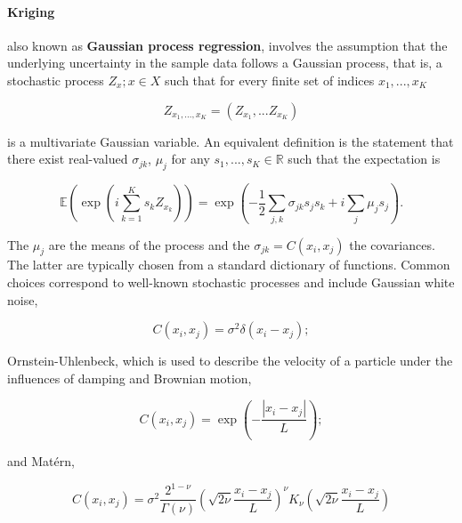 \paragraph{Kriging} also known as \textbf{Gaussian process regression}, involves the assumption that the underlying uncertainty 
in the sample data follows a Gaussian process, that is, a stochastic process ${Z_x; x \in X}$ such 
that for every finite set of indices $x_1, ... , x_K$

\begin{equation}
Z_{x_1, ... , x_K} = \left ( Z_{x_1}, ... Z_{x_K} \right )
\end{equation}

is a multivariate Gaussian variable.  An equivalent definition is the statement that there exist 
real-valued $\sigma_{jk}$, $\mu_j$ for any $s_1, ... , s_K \in \mathbb{R}$ such that the 
expectation is

\begin{equation}
\mathbb{E} \left ( \exp \left ( i \sum_{k=1}^K {s_k Z_{x_k} }\right ) \right ) = \exp \left ( 
-\frac{1}{2} \sum_{j,k} \sigma_{jk} s_j s_k + i \sum_{j}{\mu_j s_j } \right ).
\end{equation}

The $\mu_j$ are the means of the process and the $\sigma_{jk}=C(x_i, x_j)$ the covariances.  
The latter are typically chosen from a standard dictionary of functions.
Common choices correspond to 
well-known stochastic processes and include Gaussian white noise,

\begin{equation}\label{eq:stoch}
C(x_i, x_j) = \sigma^2 \delta(x_i-x_j);
\end{equation}

Ornstein-Uhlenbeck, which is used to describe the velocity of a particle under the influences of 
damping and Brownian motion,

\begin{equation}\label{eq:OU}
C(x_i, x_j) = \exp \left ( -\frac{|x_i-x_j|}{L}\right );
\end{equation}

and Mat\'ern, 

\begin{equation}\label{eq:matern}
C(x_i, x_j) = \sigma^2 \frac{2^{1-\nu}}{\Gamma(\nu)} \left ( \sqrt{2 \nu} \frac{x_i-x_j}{L} \right 
)^{\nu} K_{\nu} \left ( \sqrt{2 \nu} \frac{x_i-x_j}{L} \right)
\end{equation}

